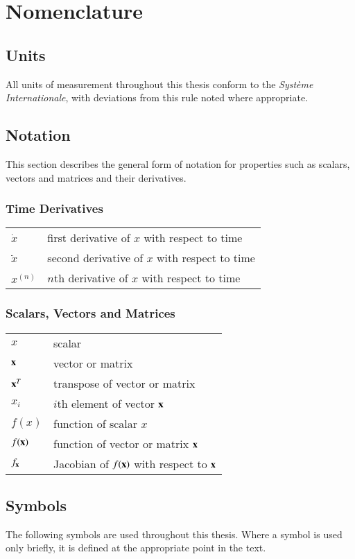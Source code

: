 \chapter*{Nomenclature}

\section*{Units}
All units of measurement throughout this thesis conform to the \emph{Syst\`{e}me Internationale}, with deviations from this rule noted where appropriate.

\section*{Notation}
This section describes the general form of notation for properties such as scalars, vectors and matrices and their derivatives.

\subsection*{Time Derivatives}
\begin{tabular}{@{}l l}
$\dot{x}$		& first derivative of $x$ with respect to time \\
$\ddot{x}$		& second derivative of $x$ with respect to time \\
$x^{(n)}$		& $n$th derivative of $x$ with respect to time \\
\end{tabular}

\subsection*{Scalars, Vectors and Matrices}
\begin{tabular}{@{}l l}
$x$				& scalar \\
$\boldsymbol{\mathbf{x}}$		& vector or matrix \\
$\boldsymbol{\mathbf{x}}^T$		& transpose of vector or matrix \\
$x_i$			& $i$th element of vector $\boldsymbol{\mathbf{x}}$ \\
$f(x)$			& function of scalar $x$ \\
$f(\boldsymbol{\mathbf{x}})$		& function of vector or matrix $\boldsymbol{\mathbf{x}}$ \\
$f_{\boldsymbol{\mathbf{x}}}$		& Jacobian of $f(\boldsymbol{\mathbf{x}})$ with respect to $\boldsymbol{\mathbf{x}}$ \\
\end{tabular}

\section*{Symbols}
The following symbols are used throughout this thesis.  Where a symbol is used only briefly, it is defined at the appropriate point in the text.

